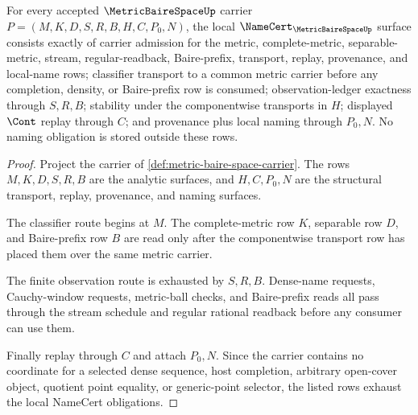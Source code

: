 \begin{theorem}
\label{thm:metric-baire-space-namecert-obligations}
For every accepted $\MetricBaireSpaceUp$ carrier
$P=(M,K,D,S,R,B,H,C,P_0,N)$, the local
$\NameCert_{\MetricBaireSpaceUp}$ surface consists exactly of carrier
admission for the metric, complete-metric, separable-metric, stream,
regular-readback, Baire-prefix, transport, replay, provenance, and local-name
rows; classifier transport to a common metric carrier before any completion,
density, or Baire-prefix row is consumed; observation-ledger exactness through
$S,R,B$; stability under the componentwise transports in $H$; displayed
$\Cont$ replay through $C$; and provenance plus local naming through $P_0,N$.
No naming obligation is stored outside these rows.
\end{theorem}
\begin{proof}
Project the carrier of \autoref{def:metric-baire-space-carrier}. The rows
$M,K,D,S,R,B$ are the analytic surfaces, and $H,C,P_0,N$ are the structural
transport, replay, provenance, and naming surfaces.

The classifier route begins at $M$. The complete-metric row $K$, separable
row $D$, and Baire-prefix row $B$ are read only after the componentwise
transport row has placed them over the same metric carrier.

The finite observation route is exhausted by $S,R,B$. Dense-name requests,
Cauchy-window requests, metric-ball checks, and Baire-prefix reads all pass
through the stream schedule and regular rational readback before any consumer
can use them.

Finally replay through $C$ and attach $P_0,N$. Since the carrier contains no
coordinate for a selected dense sequence, host completion, arbitrary
open-cover object, quotient point equality, or generic-point selector, the
listed rows exhaust the local NameCert obligations.
\end{proof}


